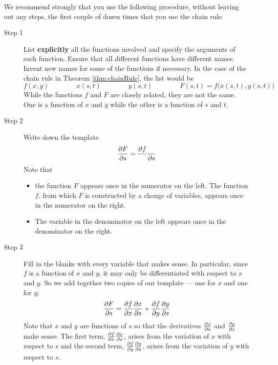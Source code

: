 We recommend strongly that you use the following procedure, without leaving
out any steps, the first couple of dozen times that you use the chain rule.
\begin{description}
\item[Step 1] 
List \textbf{explicitly} all the functions involved and specify the
arguments of each function. Ensure that all different functions have different
names. Invent new names for some of the functions if necessary. In the
case of the chain rule in Theorem  \ref{thm:chainRule}, the list would be
\begin{equation*}
f(x,y)\qquad\qquad
x(s,t)\qquad\qquad
y(s,t)\qquad\qquad
F(s,t)=f\big(x(s,t),y(s,t)\big)
\end{equation*}
While the functions $f$ and $F$ are closely related, they are not the same.
One is a function of $x$ and $y$ while the other is a function of $s$ and
$t$.
\item[Step 2] 
Write down the template
\begin{equation*}
\pdiff{F}{s}=\frac{\partial f}{ }\frac{ }{\partial s}
\end{equation*}
Note that 
\begin{itemize}
\item
the function $F$ appears once in the numerator on the left.
The function $f$, from which $F$ is constructed by a change of variables,
appears once in the numerator on the right.

\item
The variable in the denominator on the left appears once in the
denominator on the right. 
\end{itemize}

\item[Step 3] 
Fill in the blanks with every variable that makes sense. In 
particular, since $f$ is a function of $x$ and $y$, it may only be 
differentiated with respect to $x$ and $y$. So we add together
two copies of our template --- one for $x$ and one for $y$:
\begin{equation*}
\pdiff{F}{s}
=\pdiff{f}{x }\pdiff{x }{s}
+\pdiff{f}{y }\pdiff{y }{s}
\end{equation*}
Note that $x$ and $y$ are functions of $s$ so that the derivatives
$\pdiff{x }{s}$ and $\pdiff{y }{s}$ make sense.
The first term, $\pdiff{f}{x }\pdiff{x }{s}$, arises from the variation
of $x$ with respect to $s$ and the second term, $\pdiff{f}{y }\pdiff{y }{s}$, 
arises from the variation of $y$ with respect to $s$.



\end{description}
